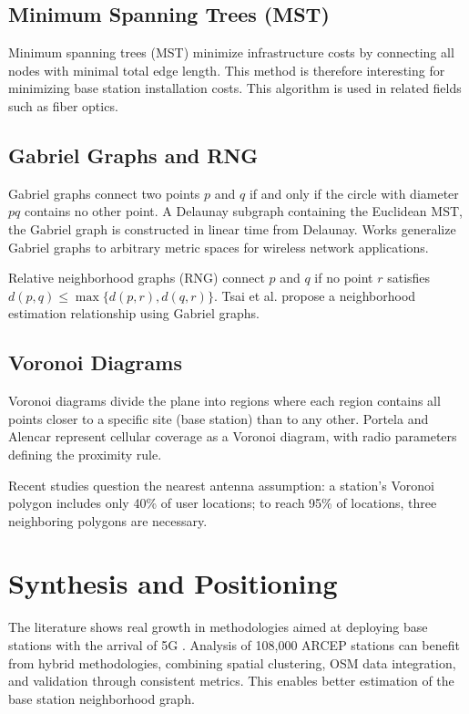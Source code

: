 \documentclass[12pt,a4paper]{report}
\begin{document}
\subsection{Minimum Spanning Trees (MST)}

Minimum spanning trees (MST) minimize infrastructure costs by connecting all nodes with minimal total edge length. This method is therefore interesting for minimizing base station installation costs. This algorithm is used in related fields such as fiber optics.

\subsection{Gabriel Graphs and RNG}

Gabriel graphs \cite{gabriel1969statistical} connect two points $p$ and $q$ if and only if the circle with diameter $pq$ contains no other point. A Delaunay subgraph containing the Euclidean MST, the Gabriel graph is constructed in linear time from Delaunay. Works generalize Gabriel graphs to arbitrary metric spaces for wireless network applications.

Relative neighborhood graphs (RNG) \cite{toussaint1980relative} connect $p$ and $q$ if no point $r$ satisfies $d(p,q) \leq \max\{d(p,r), d(q,r)\}$. Tsai et al. \cite{tsai2013hole} propose a neighborhood estimation relationship using Gabriel graphs.

\subsection{Voronoi Diagrams}

Voronoi diagrams divide the plane into regions where each region contains all points closer to a specific site (base station) than to any other. Portela and Alencar \cite{portela2008cellular} represent cellular coverage as a Voronoi diagram, with radio parameters defining the proximity rule.

Recent studies question the nearest antenna assumption: a station's Voronoi polygon includes only 40\% of user locations; to reach 95\% of locations, three neighboring polygons are necessary.

\section{Synthesis and Positioning}

The literature shows real growth in methodologies aimed at deploying base stations with the arrival of 5G \cite{tyrovolas2022hybrid,mei2021realtime}. Analysis of 108,000 ARCEP stations \cite{arcep2023donnees} can benefit from hybrid methodologies, combining spatial clustering, OSM data integration, and validation through consistent metrics. This enables better estimation of the base station neighborhood graph.
\end{document}
